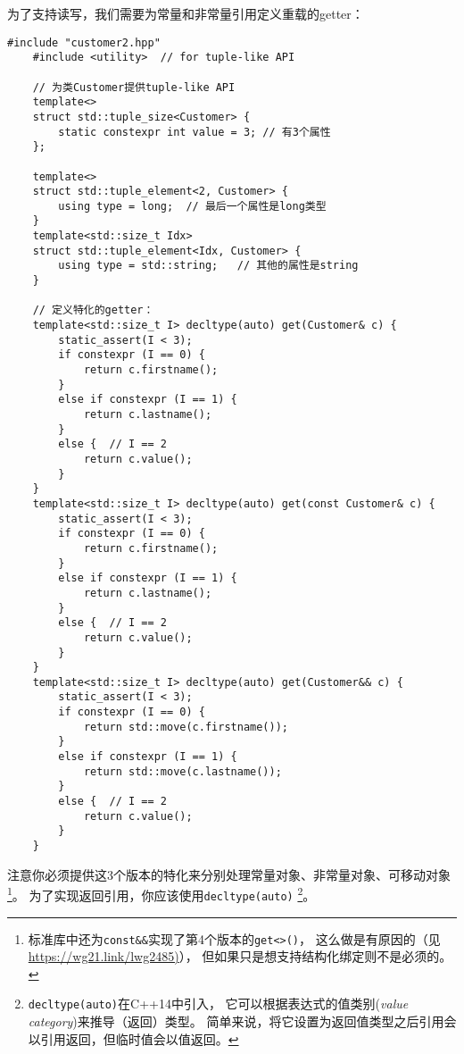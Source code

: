 为了支持读写，我们需要为常量和非常量引用定义重载的getter：
\begin{lstlisting}[frame=single, title=lang/structbind2.hpp]
    #include "customer2.hpp"
    #include <utility>  // for tuple-like API

    // 为类Customer提供tuple-like API
    template<>
    struct std::tuple_size<Customer> {
        static constexpr int value = 3; // 有3个属性
    };

    template<>
    struct std::tuple_element<2, Customer> {
        using type = long;  // 最后一个属性是long类型
    }
    template<std::size_t Idx>
    struct std::tuple_element<Idx, Customer> {
        using type = std::string;   // 其他的属性是string
    }

    // 定义特化的getter：
    template<std::size_t I> decltype(auto) get(Customer& c) {
        static_assert(I < 3);
        if constexpr (I == 0) {
            return c.firstname();
        }
        else if constexpr (I == 1) {
            return c.lastname();
        }
        else {  // I == 2
            return c.value();
        }
    }
    template<std::size_t I> decltype(auto) get(const Customer& c) {
        static_assert(I < 3);
        if constexpr (I == 0) {
            return c.firstname();
        }
        else if constexpr (I == 1) {
            return c.lastname();
        }
        else {  // I == 2
            return c.value();
        }
    }
    template<std::size_t I> decltype(auto) get(Customer&& c) {
        static_assert(I < 3);
        if constexpr (I == 0) {
            return std::move(c.firstname());
        }
        else if constexpr (I == 1) {
            return std::move(c.lastname());
        }
        else {  // I == 2
            return c.value();
        }
    }
\end{lstlisting}
注意你必须提供这3个版本的特化来分别处理常量对象、非常量对象、可移动对象
\footnote{标准库中还为\texttt{const\&\&}实现了第4个版本的\texttt{get<>()}，
这么做是有原因的（见\url{https://wg21.link/lwg2485)}），
但如果只是想支持结构化绑定则不是必须的。}。
为了实现返回引用，你应该使用\texttt{decltype(auto)}
\footnote{\texttt{decltype(auto)}在C++14中引入，
它可以根据表达式的值类别(\emph{value category})来推导（返回）类型。
简单来说，将它设置为返回值类型之后引用会以引用返回，但临时值会以值返回。}。

